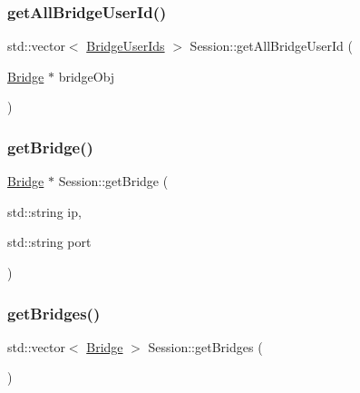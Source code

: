 \mbox{\label{class_session_aebdcfdb0abc3e0eff515fcf274eec8b7}} 
\subsubsection{\texorpdfstring{get\+All\+Bridge\+User\+Id()}{getAllBridgeUserId()}\hspace{0.1cm}{\footnotesize\ttfamily [3/3]}}
{\footnotesize\ttfamily std\+::vector$<$ \hyperlink{class_bridge_user_ids}{Bridge\+User\+Ids} $>$ Session\+::get\+All\+Bridge\+User\+Id (\begin{DoxyParamCaption}\item[{\hyperlink{class_bridge}{Bridge} $\ast$}]{bridge\+Obj }\end{DoxyParamCaption})}

\mbox{\label{class_session_a5731961d665ab9e0a01f5c95b1114f88}} 
\subsubsection{\texorpdfstring{get\+Bridge()}{getBridge()}}
{\footnotesize\ttfamily \hyperlink{class_bridge}{Bridge} $\ast$ Session\+::get\+Bridge (\begin{DoxyParamCaption}\item[{std\+::string}]{ip,  }\item[{std\+::string}]{port }\end{DoxyParamCaption})}

\mbox{\label{class_session_a44ef564f39f3b819313e339c0b174f4f}} 
\subsubsection{\texorpdfstring{get\+Bridges()}{getBridges()}}
{\footnotesize\ttfamily std\+::vector$<$ \hyperlink{class_bridge}{Bridge} $>$ Session\+::get\+Bridges (\begin{DoxyParamCaption}{ }\end{DoxyParamCaption})}

